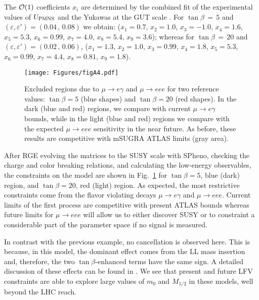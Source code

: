 \documentclass[a4paper,11pt]{article}
\newcommand{\vep}{\varepsilon}
\begin{document}
The ${\cal O}(1)$ coefficients $x_i$ are determined by the combined fit of the experimental values of $U_{\rm PMNS}$ \cite{Patrignani:2016xqp} and the Yukawas at the GUT scale \cite{Antusch:2013jca}. For $\tan\beta\,=\,5$ and $(\vep,\vep')=(0.04\,,\,0.08)$ we obtain: ($x_1=0.7$, $x_2=1.0$, $x_3=-1.0$, $x_4=1.6$, $x_5=5.3$, $x_6=0.99$, $x_7=4.0$, $x_8=5.4$, $x_9=3.6$); whereas for $\tan\beta \,=\,20$ and $(\vep,\vep')=(0.02\,,\,0.06)$, ($x_1=1.3$, $x_2=1.0$, $x_3=0.99$, $x_4=1.8$, $x_5=5.3$, $x_6=0.99$, $x_7=4.4$, $x_8=0.81$, $x_9=1.8$).
\\
\begin{figure}[h!]
  \centering
  \captionsetup{width=.9\linewidth}
  \vspace{-0.75cm}
  \texttt{[image: Figures/figA4.pdf]}
  \caption{Excluded regions due to $\mu \to e \gamma$  and $\mu\to eee$ for two reference values: $\tan\beta = 5$ (blue shapes)
and $\tan \beta = 20$ (red shapes). In the dark (blue and red) regions, we compare with current $\mu \to e \gamma$  bounds,
while in the light (blue and red) regions we compare with the expected $\mu\to eee$ sensitivity in the near future.
As before, these results are competitive with mSUGRA ATLAS limits (gray area).}
  \label{fig:A4currents}
\end{figure}

After RGE evolving the matrices to the SUSY scale with SPheno, checking the charge and color breaking relations, and calculating the low-energy observables, the constraints on the model are shown in Fig.~\ref{fig:A4currents} for $\tan\beta = 5$, blue (dark) region, and $\tan\beta =20$, red (light) region. As expected, the most restrictive constraints come from the flavor violating decays $\mu \to e \gamma$ and $\mu \to e e e$. Current limits of the first process are competitive with present ATLAS bounds whereas future limits for $\mu \to e e e$ will allow us to either discover SUSY or to constraint a considerable part of the parameter space if no signal is measured.

In contrast with the previous example, no cancellation is observed here. This is because, in this model, the dominant effect comes from the LL mass insertion and, therefore, the two $\tan\beta$-enhanced terms have the same sign. A detailed discussion of these effects can be found in \cite{Ciuchini:2007ha}. We see that present and future LFV constraints are able to explore large values of $m_0$ and $M_{1/2}$ in these models, well beyond the LHC reach. 
\end{document}
